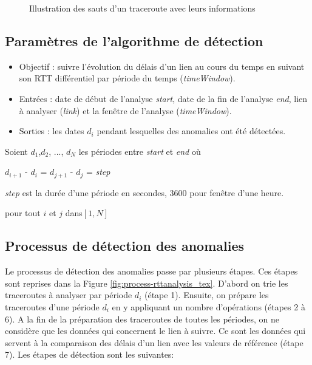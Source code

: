 \begin{figure}[H]
	\centering
	\captionsetup{justification=centering}
	\resizebox{\textwidth}{!}{
	
}
	\caption{Illustration des sauts d'un traceroute avec leurs informations}
	\label{fig:traceroute}
\end{figure}

\subsection{Paramètres de l'algorithme de  détection}

\begin{itemize}
		\item  Objectif : suivre l'évolution du délais d'un lien au cours du temps en suivant son RTT différentiel par période du temps (\textit{timeWindow}).
	\item Entrées : date de début de l'analyse \textit{start}, date de la fin de l'analyse \textit{end}, lien à analyser (\textit{link}) et la fenêtre de l'analyse (\textit{timeWindow}).
	\item Sorties : les dates $d_i$ pendant lesquelles des anomalies ont été détectées.
\end{itemize}

Soient $ d_1 $,$  d_2 $, ..., $ d_N $ les périodes entre \textit{start} et \textit{end} où

\begin{center}
	 $  d_{i+1} $ - $  d_{i} $ = $  d_{j+1} $ - $  d_{j} $ = \textit{step} 
	 
	 \textit{step} est la durée d'une période en secondes, $3600$ pour fenêtre d'une heure.
\end{center}
 
 pour tout $ i $ et $ j $ dans$  [1,N] $
\subsection{Processus de  détection des anomalies }\label{steps-rtt-analysis}

Le processus de  détection des anomalies passe par plusieurs étapes. Ces étapes sont reprises dans  la Figure \ref{fig:process-rttanalysis_tex}. D'abord on  trie les traceroutes à analyser par période $d_i$ (étape 1). Ensuite, on prépare les traceroutes d'une période $d_i$ en y appliquant un nombre d'opérations (étapes  2 à 6). A la fin de la préparation des traceroutes de toutes les périodes, on ne considère que les données qui concernent le lien à suivre. Ce sont les données qui servent à la comparaison  des  délais d'un lien avec les valeurs de référence (étape 7). Les étapes de détection sont les suivantes:


